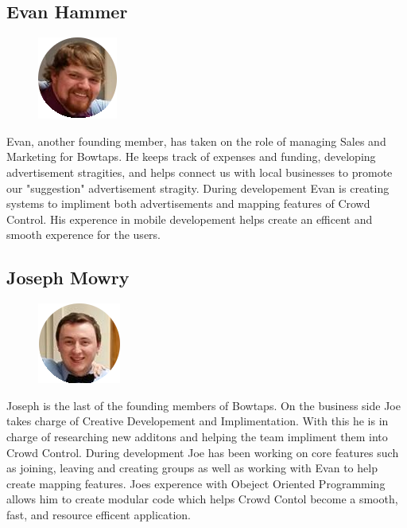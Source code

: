 \noindent
\subsection{Evan Hammer}
\begin{figure}
\includegraphics{evanhammer}
\end{figure}
Evan, another founding member, has taken on the role of managing Sales and Marketing for Bowtaps. He keeps track of expenses and funding, developing advertisement stragities, and helps connect us with local businesses to promote our "suggestion" advertisement stragity. During developement Evan is creating systems to impliment both advertisements and mapping features of Crowd Control. His experence in mobile developement helps create an efficent and smooth experence for the users.
\newline
\newline
\newline
 
\noindent
\subsection{Joseph Mowry}
\begin{figure}
\includegraphics{joemowry}
\end{figure}
Joseph is the last of the founding members of Bowtaps. On the business side Joe takes charge of Creative Developement and Implimentation. With this he is in charge of researching new additons and helping the team impliment them into Crowd Control. During development Joe has been working on core features such as joining, leaving and creating groups as well as working with Evan to help create mapping features. Joes experence with Obeject Oriented Programming allows him to create modular code which helps Crowd Contol become a smooth, fast, and resource efficent application.
\newline
\newline
\newline
\newline

